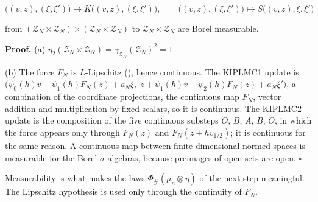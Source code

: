 \documentclass[11pt,a4paper]{article}
\begin{document}
\[\bigl((v,z),(\xi,\xi')\bigr)\mapsto K\bigl((v,z),(\xi,\xi')\bigr),\qquad\bigl((v,z),(\xi,\xi')\bigr)\mapsto S\bigl((v,z),\xi,\xi'\bigr)\]


from \((\mathcal Z_N\times\mathcal Z_N)\times(\mathcal Z_N\times\mathcal Z_N)\) to \(\mathcal Z_N\times\mathcal Z_N\) are Borel measurable.




\textbf{Proof.} (a) \(\eta_2(\mathcal Z_N\times\mathcal Z_N)=\gamma_{\mathcal Z_N}(\mathcal Z_N)^2=1\).




(b) The force \(F_N\) is \(L\)-Lipschitz (\cite[Section~3.1.5]{LangevinLean2026KIPLMC}), hence continuous. The KIPLMC1 update is \(\bigl(\psi_0(h)v-\psi_1(h)F_N(z)+a_N\xi,\;z+\psi_1(h)v-\psi_2(h)F_N(z)+a_N\xi'\bigr)\), a combination of the coordinate projections, the continuous map \(F_N\), vector addition and multiplication by fixed scalars, so it is continuous. The KIPLMC2 update is the composition of the five continuous substeps \(O\), \(B\), \(A\), \(B\), \(O\), in which the force appears only through \(F_N(z)\) and \(F_N(z+hv_{1/2})\); it is continuous for the same reason. A continuous map between finite-dimensional normed spaces is measurable for the Borel \(\sigma\)-algebras, because preimages of open sets are open. \(\square\)




Measurability is what makes the laws \(\Phi_\#(\mu_n\otimes\eta)\) of the next step meaningful. The Lipschitz hypothesis is used only through the continuity of \(F_N\).
\end{document}
